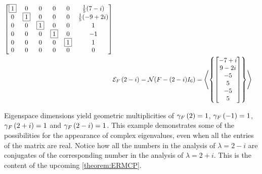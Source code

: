 \documentclass{ximera}
\begin{document}
\begin{example}
\begin{align*}
\begin{bmatrix}
               \fbox{1} & 0 & 0 & 0 & 0 & \frac{1}{5}(7-i)\\
               0 & \fbox{1} & 0 & 0 & 0 & \frac{1}{5}(-9+2i)\\
               0 & 0 & \fbox{1} & 0 & 0 & 1\\
               0 & 0 & 0 & \fbox{1} & 0 & -1\\
               0 & 0 & 0 & 0 & \fbox{1} & 1\\
               0 & 0 & 0 & 0 & 0 & 0
             \end{bmatrix}\\
           &\mathcal{E}_{F}\left(2-i\right)=\mathcal{N}\!\left(F-(2-i)I_6\right)
             =\left\langle\left\{\begin{bmatrix}-7+i\\9-2i\\-5\\5\\-5\\5\end{bmatrix}\right\}\right\rangle\\
  \end{align*}
  
  Eigenspace dimensions yield geometric multiplicities of
  $\gamma_{F}\left(2\right)=1$, $\gamma_{F}\left(-1\right)=1$, $\gamma_{F}\left(2+i\right)=1$ and
  $\gamma_{F}\left(2-i\right)=1$.  This example demonstrates some of the
  possibilities for the appearance of complex eigenvalues, even when
  all the entries of the matrix are real.  Notice how all the numbers
  in the analysis of $\lambda=2-i$ are conjugates of the corresponding
  number in the analysis of $\lambda=2+i$.  This is the content of the
  upcoming \ref{theorem:ERMCP}.
\end{example}
\end{document}
